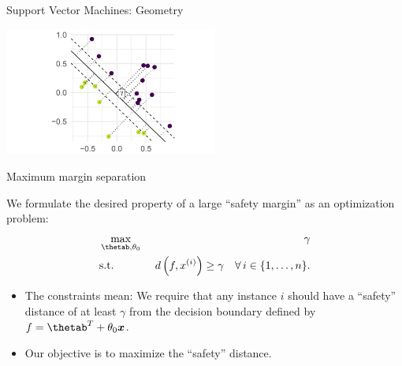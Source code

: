 \begin{vbframe}{Support Vector Machines: Geometry}
\begin{center}
\includegraphics[width =7cm]{figure_man/svm-geometry02.png} \\
\end{center}


\end{vbframe}

\begin{vbframe}{Maximum margin separation}

  We formulate the desired property of a large \enquote{safety margin} as an optimization problem:
  \begin{eqnarray*}
    & \max\limits_{\thetab, \theta_0} & \gamma \\
    & \text{s.t.} & \,\, d \left(f, \xi \right) \geq \gamma \quad \forall\, i \in \nset.
    \end{eqnarray*}

    \begin{itemize}
      \item The constraints mean: We require that any instance $i$ should have a \enquote{safety} distance of at least $\gamma$ from the decision boundary defined by $f = \thetab^T + \theta_0 \xv$.
      \item Our objective is to maximize the \enquote{safety} distance.
    \end{itemize}

\end{vbframe}


